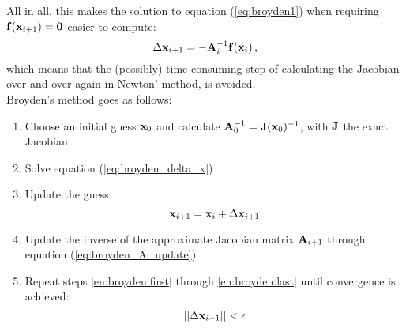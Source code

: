         All in all, this makes the solution to equation (\ref{eq:broyden1}) when requiring $\vb{f}(\vb{x}_{i+1}) = \vb{0}$ easier to compute:
        \begin{equation} \label{eq:broyden_delta_x}
            \Delta \vb{x}_{i+1} = - \vb{A}_i^{-1} \vb{f}(\vb{x}_i) \thinspace ,
        \end{equation}
        which means that the (possibly) time-consuming step of calculating the Jacobian over and over again in Newton' method, is avoided. \\

        Broyden's method goes as follows:
        \begin{enumerate}
            \item Choose an initial guess $\vb{x}_0$ and calculate $\vb{A}_0^{-1} = \vb{J}(\vb{x}_0)^{-1}$, with $\vb{J}$ the exact Jacobian
            \item \label{en:broyden:first} Solve equation (\ref{eq:broyden_delta_x})
            \item Update the guess
                \begin{equation}
                    \vb{x}_{i+1} = \vb{x}_i + \Delta \vb{x}_{i+1}
                \end{equation}
            \item \label{en:broyden:last} Update the inverse of the approximate Jacobian matrix $\vb{A}_{i+1}$ through equation (\ref{eq:broyden_A_update})
            \item Repeat steps \ref{en:broyden:first} through \ref{en:broyden:last} until convergence is achieved:
                \begin{equation}
                    || \Delta \vb{x}_{i+1} || < \epsilon
                \end{equation}
        \end{enumerate}
